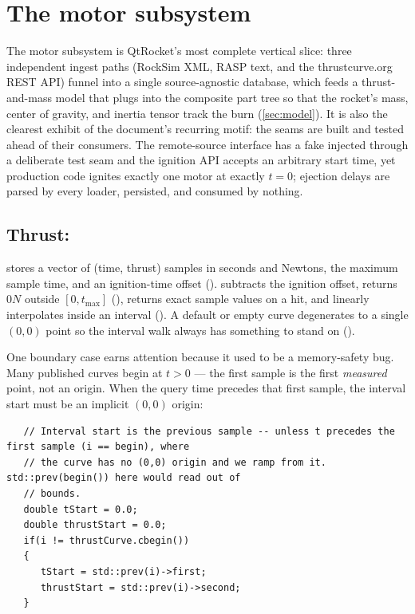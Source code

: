 \section{The motor subsystem}\label{sec:motors}

The motor subsystem is QtRocket's most complete vertical slice: three independent ingest paths
(RockSim XML, RASP text, and the thrustcurve.org REST API) funnel into a single source-agnostic
database, which feeds a thrust-and-mass model that plugs into the composite part tree so that the
rocket's mass, center of gravity, and inertia tensor track the burn (\cref{sec:model}). It is also
the clearest exhibit of the document's recurring motif: the seams are built and tested ahead of
their consumers. The remote-source interface has a fake injected through a deliberate test seam
and the ignition API accepts an arbitrary start time, yet production code ignites exactly one
motor at exactly $t=0$; ejection delays are parsed by every loader, persisted, and consumed by
nothing.

\subsection{Thrust: }\label{sec:motors-thrust}

 stores a vector of (time, thrust) samples in seconds and Newtons, the maximum
sample time, and an ignition-time offset (). 
subtracts the ignition offset, returns $0\unit{N}$ outside $[0, t_{\max}]$
(), returns exact sample values on a hit, and linearly interpolates
inside an interval (). A default or empty curve degenerates to a
single $(0,0)$ point so the interval walk always has something to stand on
().

One boundary case earns attention because it used to be a memory-safety bug. Many published curves
begin at $t > 0$ --- the first sample is the first \emph{measured} point, not an origin. When the
query time precedes that first sample, the interval start must be an implicit $(0,0)$ origin:

\begin{listing}[htbp]
\begin{verbatim}
   // Interval start is the previous sample -- unless t precedes the first sample (i == begin), where
   // the curve has no (0,0) origin and we ramp from it. std::prev(begin()) here would read out of
   // bounds.
   double tStart = 0.0;
   double thrustStart = 0.0;
   if(i != thrustCurve.cbegin())
   {
      tStart = std::prev(i)->first;
      thrustStart = std::prev(i)->second;
   }
\end{verbatim}
\caption{The implicit-origin ramp in .}
\label{lst:motors-ramp}
\end{listing}

